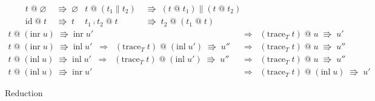 \documentclass[a4j, dvipdfmx]{jsarticle}
\theoremstyle{definition}
\newcommand{\reduct}[2]{#1 &\;\Rrightarrow\; #2}
\newcommand{\reduction}[2]{#1 \;\Rrightarrow\; #2}
\begin{document}
\begin{figure}[H]
\begin{align*}
    \reduct{t\;\text{@}\;\varnothing}{\varnothing} &
    \reduct{t\;\text{@}\;(t_1\parallel{}t_2)}{(t\;\text{@}\;t_1)\parallel(t\;\text{@}\;t_2)} \\
    \reduct{\text{id}\;\text{@}\;t}{t} &
    \reduct{t_1\fcmp{}t_2\;\text{@}\;t}{t_2\;\text{@}\;(t_1\;\text{@}\;t)}
  \end{align*}
  \begin{align*}
    \reduction{t\;\text{@}\;(\text{inr}\;u)}{\text{inr}\;u'} &\;\;\Longrightarrow\;\; \reduction{(\text{trace}_T\;t)\;\text{@}\;u}{u'} \\
    \reduction{t\;\text{@}\;(\text{inr}\;u)}{\text{inl}\;u'} \;\;\Longrightarrow\;\; \reduction{(\text{trace}_T\;t)\;\text{@}\;(\text{inl}\;u')}{u''} &\;\;\Longrightarrow\;\; \reduction{(\text{trace}_T\;t)\;\text{@}\;u}{u''} \\
    \reduction{t\;\text{@}\;(\text{inl}\;u)}{\text{inl}\;u'} \;\;\Longrightarrow\;\; \reduction{(\text{trace}_T\;t)\;\text{@}\;(\text{inl}\;u')}{u''} &\;\;\Longrightarrow\;\; \reduction{(\text{trace}_T\;t)\;\text{@}\;u}{u''} \\
    \reduction{t\;\text{@}\;(\text{inl}\;u)}{\text{inr}\;u'} &\;\;\Longrightarrow\;\; \reduction{(\text{trace}_T\;t)\;\text{@}\;(\text{inl}\;u)}{u'}
  \end{align*}
  \caption{Reduction}
  \label{fig:reduction}
\end{figure}
\end{document}
